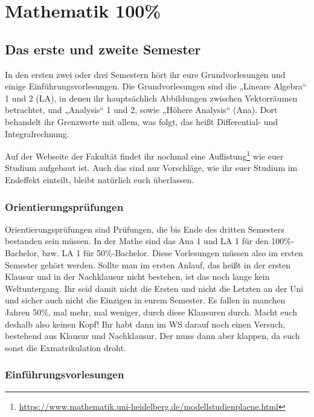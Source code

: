 \section{Mathematik 100\%}

\subsection{Das erste und zweite Semester}

In den ersten zwei oder drei Semestern hört ihr eure Grundvorlesungen und einige Einführungsvorlesungen. Die Grundvorlesungen sind die „Lineare Algebra“ 1 und 2 (\gls{LA}), in denen ihr hauptsächlich Abbildungen zwischen Vektorräumen betrachtet, und „Analysis“ 1 und 2, sowie „Höhere Analysis“ (\gls{Ana}). Dort behandelt ihr Grenzwerte mit allem, was folgt, das heißt Differential- und Integralrechnung.

Auf der Webseite der Fakultät findet ihr nochmal eine Auflistung\footnote{\url{https://www.mathematik.uni-heidelberg.de/modellstudienplaene.html}} wie euer Studium aufgebaut ist. Auch das sind nur Vorschläge, wie ihr euer Studium im Endeffekt einteilt, bleibt natürlich euch überlassen.

\subsubsection{Orientierungsprüfungen}

Orientierungsprüfungen sind Prüfungen, die bis Ende des dritten Semesters bestanden sein müssen. In der Mathe sind das Ana 1 und LA 1 für den 100\%-Bachelor, bzw. LA 1 für 50\%-Bachelor. Diese Vorlesungen müssen also im ersten Semester gehört werden. Sollte man im ersten Anlauf, das heißt in der ersten Klausur und in der Nachklausur nicht bestehen, ist das noch lange kein Weltuntergang. Ihr seid damit nicht die Ersten und nicht die Letzten an der Uni und sicher auch nicht die Einzigen in eurem Semester. Es fallen in manchen Jahren 50\%, mal mehr, mal weniger, durch diese Klausuren durch. Macht euch deshalb also keinen Kopf! Ihr habt dann im WS darauf noch einen Versuch, bestehend aus Klausur und Nachklausur. Der muss dann aber klappen, da euch sonst die Exmatrikulation droht.

\subsubsection{Einführungsvorlesungen}

